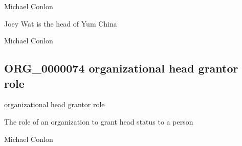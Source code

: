 \documentclass[letterpaper,10pt,english]{sphinxmanual}
\begin{document}
\begin{sphinxShadowBox}

\sphinxAtStartPar
Michael Conlon 
\end{sphinxShadowBox}

\begin{sphinxShadowBox}

\sphinxAtStartPar
Joey Wat is the head of Yum China
\end{sphinxShadowBox}

\begin{sphinxShadowBox}

\sphinxAtStartPar
Michael Conlon 
\end{sphinxShadowBox}
\begin{quote}

\ignorespaces \end{quote}


\subsection{ORG\_0000074 \sphinxhyphen{} organizational head grantor role}
\label{\detokenize{doc-ORG_0000074:org-0000074-organizational-head-grantor-role}}\label{\detokenize{doc-ORG_0000074:index-0}}\label{\detokenize{doc-ORG_0000074::doc}}
\begin{sphinxShadowBox}

\sphinxAtStartPar
organizational head grantor role
\end{sphinxShadowBox}

\begin{sphinxShadowBox}

\sphinxAtStartPar
The role of an organization to grant head status to a person
\end{sphinxShadowBox}

\begin{sphinxShadowBox}

\sphinxAtStartPar
Michael Conlon 
\end{sphinxShadowBox}
\end{document}
